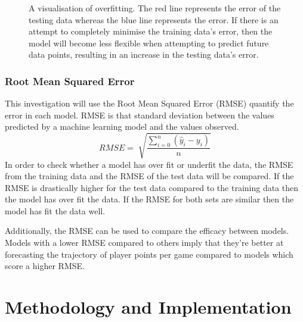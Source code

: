 \documentclass[a4paper,11pt,twoside]{article}
\begin{document}
      \begin{figure}[!htb]
      \captionsetup{justification=centering}
        \caption{\label{fig:my-label} A visualisation of overfitting. The red line represents the error of the testing data whereas the blue line represents the error. If there is an attempt to completely minimise the training data's error, then the model will become less flexible when attempting to predict future data points, resulting in an increase in the testing data's error. }
      \end{figure}

\subsubsection{Root Mean Squared Error}
This investigation will use the Root Mean Squared Error (RMSE) quantify the error in each model. RMSE is that standard deviation between the values predicted by a machine learning model and the values observed.
\begin{equation}
RMSE = \sqrt[]{\frac{\sum_{i=0}^{n}(\hat{y}_{i} - y_{i})}{n}}
\end{equation}
In order to check whether a model has over fit or underfit the data, the RMSE from the training data and the RMSE of the test data will be compared. If the RMSE is drastically higher for the test data compared to the training data then the model has over fit the data. If the RMSE for both sets are similar then the model has fit the data well. 

Additionally, the RMSE can be used to compare the efficacy between models. Models with a lower RMSE compared to others imply that they're better at forecasting the trajectory of player points per game compared to models which score a higher RMSE.



\newpage

\section{Methodology and Implementation}
\end{document}
